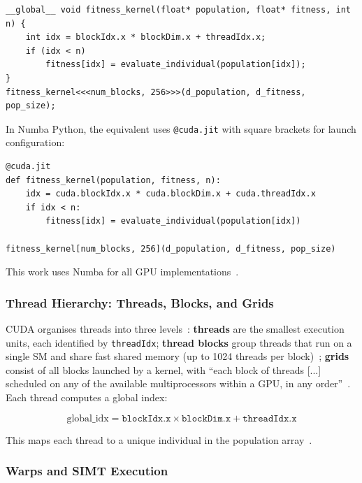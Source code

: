 \documentclass[a4paper,14pt]{extarticle}
\begin{document}
{\small
\begin{verbatim}
__global__ void fitness_kernel(float* population, float* fitness, int n) {
    int idx = blockIdx.x * blockDim.x + threadIdx.x;
    if (idx < n)
        fitness[idx] = evaluate_individual(population[idx]);
}
fitness_kernel<<<num_blocks, 256>>>(d_population, d_fitness, pop_size);
\end{verbatim}}

In Numba Python, the equivalent uses \texttt{@cuda.jit} with square brackets for launch configuration:

{\small
\begin{verbatim}
@cuda.jit
def fitness_kernel(population, fitness, n):
    idx = cuda.blockIdx.x * cuda.blockDim.x + cuda.threadIdx.x
    if idx < n:
        fitness[idx] = evaluate_individual(population[idx])

fitness_kernel[num_blocks, 256](d_population, d_fitness, pop_size)
\end{verbatim}}

This work uses Numba for all GPU implementations~\cite{numba2025cuda}.

\subsubsection*{Thread Hierarchy: Threads, Blocks, and Grids}

CUDA organises threads into three levels~\cite{nvidia2025cudaguide}: \textbf{threads} are the smallest execution units, each identified by \texttt{threadIdx}; \textbf{thread blocks} group threads that run on a single SM and share fast shared memory (up to 1024 threads per block)~\cite{nvidia2025cudaguide,sanders2010cuda}; \textbf{grids} consist of all blocks launched by a kernel, with ``each block of threads [...] scheduled on any of the available multiprocessors within a GPU, in any order''~\cite{nvidia2025cudaguide}. Each thread computes a global index:

\begin{equation}
\text{global\_idx} = \texttt{blockIdx.x} \times \texttt{blockDim.x} + \texttt{threadIdx.x}
\end{equation}

This maps each thread to a unique individual in the population array~\cite{nvidia2025cudaguide}.

\subsubsection*{Warps and SIMT Execution}
\end{document}
